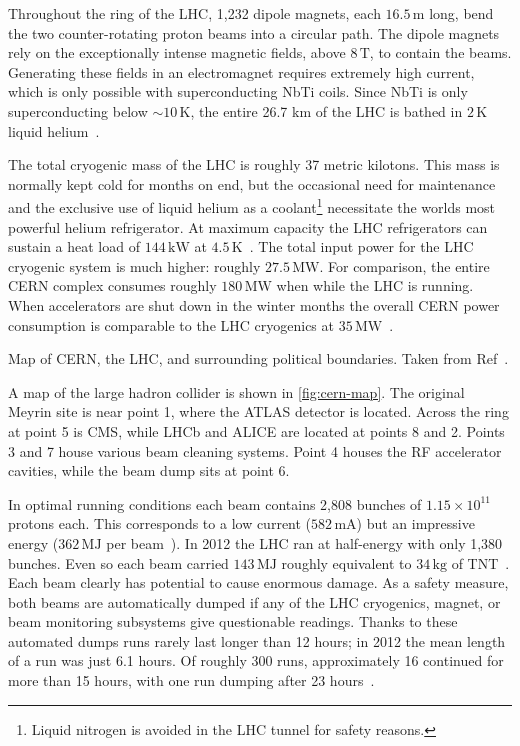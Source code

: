 Throughout the ring of the LHC, 1,232 dipole magnets, each $16.5\,\text{m}$ long, bend the two counter-rotating proton beams into a circular path. The dipole magnets rely on the exceptionally intense magnetic fields, above $8\,\mathrm{T}$, to contain the beams.
Generating these fields in an electromagnet requires extremely high current, which is only possible with superconducting NbTi coils.
Since NbTi is only superconducting below $\sim 10\,\text{K}$, the entire 26.7 km of the LHC is bathed in $2\,\text{K}$ liquid helium~\cite{lhc-machine}.

The total cryogenic mass of the LHC is roughly 37 metric kilotons.
This mass is normally kept cold for months on end, but the occasional need for maintenance and the exclusive use of liquid helium as a coolant\footnote{Liquid nitrogen is avoided in the LHC tunnel for safety reasons.} necessitate the worlds most powerful helium refrigerator. At maximum capacity the LHC refrigerators can sustain a heat load of $144\,\mathrm{kW}$ at $4.5\,\mathrm{K}$~\cite{lhc-machine}.
The total input power for the LHC cryogenic system is much higher: roughly $27.5\,\text{MW}$.
For comparison, the entire CERN complex consumes roughly $180\,\text{MW}$ when while the LHC is running. When accelerators are shut down in the winter months the overall CERN power consumption is comparable to the LHC cryogenics at $35\,\text{MW}$~\cite{lhc-energy}.

\begin{cfig}
  \caption[CERN Map]{Map of CERN, the LHC, and surrounding political boundaries. Taken from Ref~\cite{cern-map}.}
  \label{fig:cern-map}
\end{cfig}

A map of the large hadron collider is shown in \cref{fig:cern-map}.
The original Meyrin site is near point 1, where the ATLAS detector is located.
Across the ring at point 5 is CMS, while LHCb and ALICE are located at points 8 and 2.
Points 3 and 7 house various beam cleaning systems.
Point 4 houses the RF accelerator cavities, while the beam dump sits at point 6.

In optimal running conditions each beam contains 2,808 bunches of $1.15 \times 10^{11}$ protons each.
This corresponds to a low current ($582\,\text{mA}$) but an impressive energy ($362\,\text{MJ}$ per beam~\cite{lhc-machine}).
In 2012 the LHC ran at half-energy with only 1,380 bunches.
Even so each beam carried $143\,\text{MJ}$ roughly equivalent to $34\,\text{kg}$ of TNT~\cite{lhc-run1}.
Each beam clearly has potential to cause enormous damage.
As a safety measure, both beams are automatically dumped if any of the LHC cryogenics, magnet, or beam monitoring subsystems give questionable readings.
Thanks to these automated dumps runs rarely last longer than 12 hours; in 2012 the mean length of a run was just 6.1 hours.
Of roughly 300 runs, approximately 16 continued for more than 15 hours, with one run dumping after 23 hours~\cite{lhc-run1}.

